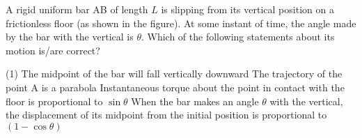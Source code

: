 

    \item A rigid uniform bar AB of length \(L\) is slipping from its vertical position on a frictionless floor (as shown in the figure). At some instant of time, the angle made by the bar with the vertical is \(\theta\). Which of the following statements about its motion is/are correct?
        \begin{tasks}(1)
            \task The midpoint of the bar will fall vertically downward
            \task The trajectory of the point A is a parabola
            \task Instantaneous torque about the point in contact with the floor is proportional to \(\sin \theta\)
            \task When the bar makes an angle \(\theta\) with the vertical, the displacement of its midpoint from the initial position is proportional to \((1 - \cos \theta)\)
        \end{tasks}
    \begin{center}
            \end{center}

